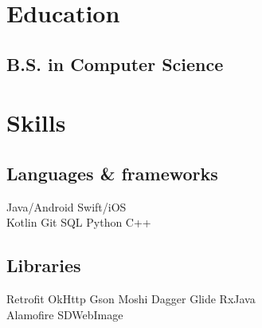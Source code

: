 \documentclass[]{deedy-resume}
\begin{document}
%
%
\lastupdated

%
%

%
%

\begin{minipage}[t]{0.33\textwidth} 


\section{Education} 

\subsection{B.S. in Computer Science}
\sectionsep

\section{Skills}
\subsection{Languages \& frameworks}
Java/Android \textbullet{}   Swift/iOS \\
Kotlin \textbullet{} Git \textbullet{} SQL \textbullet{} Python \textbullet{} C++ \\
\sectionsep

\subsection{Libraries}
Retrofit \textbullet{} OkHttp \textbullet{} Gson \textbullet{} Moshi  \textbullet{} 
Dagger \textbullet{} Glide \textbullet{} RxJava \\
Alamofire \textbullet{} SDWebImage
\sectionsep


\end{minipage}
\end{document}
